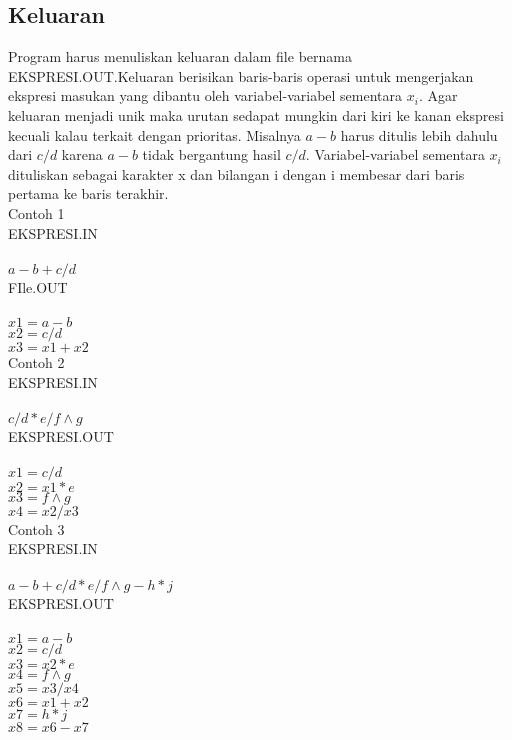 \documentclass[a4paper,10pt,makeidx]{article}
\begin{document}
\subsection {Keluaran}
\par
\indent
\indent
Program harus menuliskan keluaran dalam file bernama EKSPRESI.OUT.Keluaran
berisikan baris-baris operasi untuk mengerjakan ekspresi masukan yang dibantu
oleh variabel-variabel sementara $x_i$. Agar keluaran menjadi unik maka urutan
sedapat mungkin dari kiri ke kanan ekspresi kecuali kalau terkait dengan
prioritas. Misalnya {\bfseries $a-b$} harus ditulis lebih dahulu
dari {\bfseries $c/d$} karena {\bfseries $a-b$} tidak
bergantung hasil {\bfseries $c/d$}. Variabel-variabel sementara $x_i$
dituliskan
sebagai karakter x dan bilangan i dengan i membesar dari baris pertama ke baris
terakhir. \\

Contoh 1      \\

EKSPRESI.IN   \\ \\
$a-b+c/d$     \\

FIle.OUT        \\ \\
$x1 = a-b   $   \\
$x2 = c/d   $   \\
$x3 = x1+x2 $   \\

Contoh 2      \\

EKSPRESI.IN   \\ \\
$c/d*e/f\wedge g$   \\


EKSPRESI.OUT     \\ \\
$x1 = c/d   $    \\
$x2 = x1*e  $    \\
$x3 = f\wedge g   $    \\
$x4 = x2/x3 $    \\

Contoh 3     \\

EKSPRESI.IN  \\ \\
$a-b+c/d*e/f\wedge g-h*j  $\\

EKSPRESI.OUT       \\ \\
$x1 = a-b       $      \\
$x2 = c/d       $      \\
$x3 = x2*e      $      \\
$x4 = f\wedge g       $      \\
$x5 = x3/x4     $      \\
$x6 = x1+x2     $      \\
$x7 = h*j       $      \\
$x8 = x6-x7     $      \\
\end{document}
